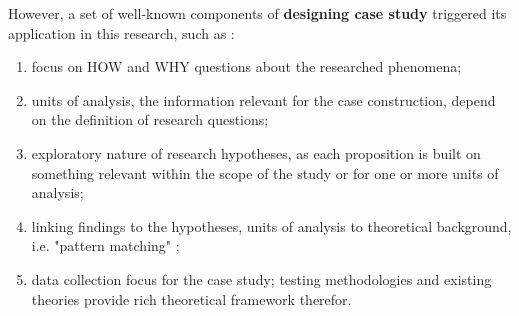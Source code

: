 \documentclass[11pt]{report}
\begin{document}
However, a set of well-known components of \textbf{designing case study} triggered its application in this research, such as \cite{(Yin 2009)}:
\begin{enumerate}
\item focus on HOW and WHY questions about the researched phenomena;
\item units of analysis, the information relevant for the case construction, depend on the definition of research questions;
\item exploratory nature of research hypotheses, as each proposition is built on something relevant within the scope of the study or for one or more units of analysis;
\item linking findings to the hypotheses, units of analysis to theoretical background, i.e. "pattern matching" \cite{Campbell 1975};
\item data collection focus for the case study; testing methodologies and existing theories provide rich theoretical framework therefor.
\end{enumerate}
\end{document}

